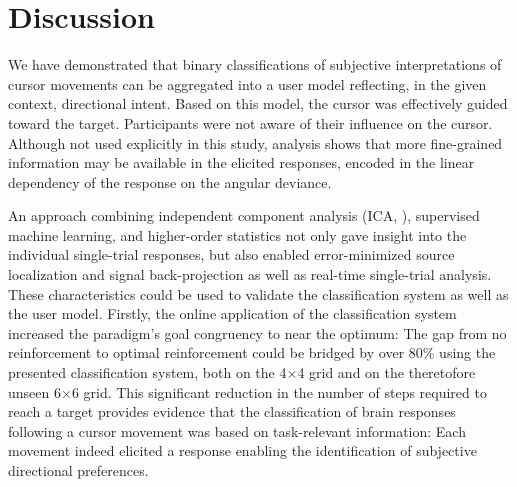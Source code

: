 \section{Discussion}

We have demonstrated that binary classifications of subjective interpretations of cursor movements can be aggregated into a user model reflecting, in the given context, directional intent. Based on this model, the cursor was effectively guided toward the target. Participants were not aware of their influence on the cursor. Although not used explicitly in this study, analysis shows that more fine-grained information may be available in the elicited responses, encoded in the linear dependency of the response on the angular deviance.

An approach combining independent component analysis (ICA, ), supervised machine learning, and higher-order statistics not only gave insight into the individual single-trial responses, but also enabled error-minimized source localization and signal back-projection as well as real-time single-trial analysis. These characteristics could be used to validate the classification system as well as the user model. Firstly, the online application of the classification system increased the paradigm's goal congruency to near the optimum: The gap from no reinforcement to optimal reinforcement could be bridged by over 80\% using the presented classification system, both on the 4$\times$4 grid and on the theretofore unseen 6$\times$6 grid. This significant reduction in the number of steps required to reach a target provides evidence that the classification of brain responses following a cursor movement was based on task-relevant information: Each movement indeed elicited a response enabling the identification of subjective directional preferences.

